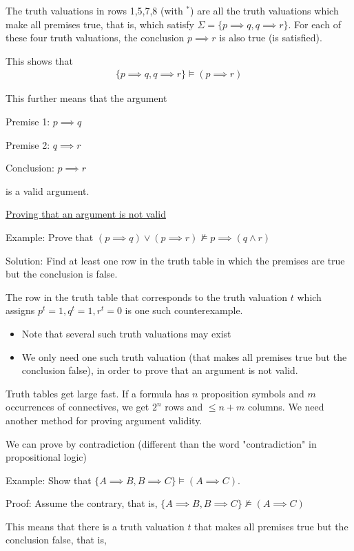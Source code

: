 \documentclass{article}
\begin{document}
The truth valuations in rows 1,5,7,8 (with $^*$) are all the truth valuations which make all premises true, that is, which satisfy $\Sigma = \{p \implies q, q \implies r\}$. For each of these four truth valuations, the conclusion $p \implies r$ is also true (is satisfied). 

This shows that 
\begin{align*}
\{p \implies q, q \implies r\} \vDash (p \implies r)
\end{align*}

This further means that the argument 

Premise 1: $p \implies q$

Premise 2: $q \implies r$

Conclusion: $p \implies r$

is a valid argument.

\underline{Proving that an argument is not valid}

Example: Prove that $(p \implies q) \vee (p \implies r) \not\vDash p \implies (q \wedge r)$

Solution: Find at least one row in the truth table in which the premises are true but the conclusion is false. 

The row in the truth table that corresponds to the truth valuation $t$ which assigns $p^t = 1, q^t = 1, r^t = 0$ is one such counterexample. 
\begin{itemize}
    \item Note that several such truth valuations may exist
    \item We only need one such truth valuation (that makes all premises true but the conclusion false), in order to prove that an argument is not valid. 
\end{itemize}

Truth tables get large fast. If a formula has $n$ proposition symbols and $m$ occurrences of connectives, we get $2^n$ rows and $\le n + m $ columns. We need another method for proving argument validity. 

We can prove by contradiction (different than the word "contradiction" in propositional logic)

Example: Show that $\{A \implies B, B \implies C\} \vDash (A \implies C)$.

Proof: Assume the contrary, that is, $\{A \implies B, B \implies C\} \not\vDash (A \implies C)$

This means that there is a truth valuation $t$ that makes all premises true but the conclusion false, that is, 
\end{document}
